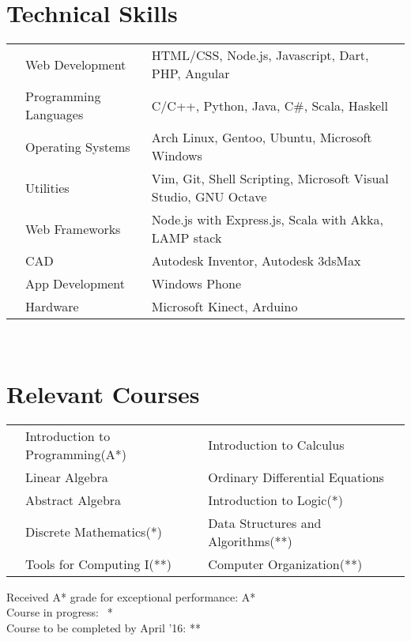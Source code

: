 \documentclass[11pt,a4paper]{article}
\begin{document}
\vspace{5mm}


\section*{Technical Skills}
\begin{tabular}{L{0.05cm} L{5cm} l}
&Web Development 	        &HTML/CSS, Node.js, Javascript, Dart, PHP, Angular \\
&Programming Languages      &C/C++, Python, Java, C\#, Scala, Haskell\\
&Operating Systems	        &Arch Linux, Gentoo, Ubuntu, Microsoft Windows\\
&Utilities                  &Vim, Git, Shell Scripting, Microsoft Visual Studio, GNU Octave\\
&Web Frameworks             &Node.js with Express.js, Scala with Akka, LAMP stack\\
&CAD	                	&Autodesk Inventor, Autodesk 3dsMax\\
&App Development		    &Windows Phone\\
&Hardware                   &Microsoft Kinect, Arduino\\

\end{tabular}\\


\section*{Relevant Courses}
\begin{tabular}{L{0.05cm} L{7cm} L{6.5cm} L{7.5cm}}
& Introduction to Programming(A*)    & Introduction to Calculus        \\
& Linear Algebra                     & Ordinary Differential  Equations\\
& Abstract Algebra                   & Introduction to Logic(*)\\
& Discrete Mathematics(*)            & Data Structures and Algorithms(**)\\
& Tools for Computing I(**)          & Computer Organization(**)\\
\end{tabular}

\begin{flushright}
  \footnotesize{Received A* grade for exceptional performance: A*}\\
  \footnotesize{Course in progress:$\ \ $ *}\\
  \footnotesize{Course to be completed by April '16: **}
\end{flushright}
\end{document}
